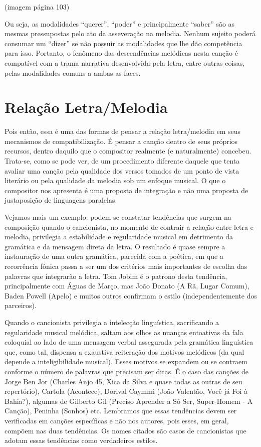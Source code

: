 (imagem página 103)

Ou seja, as modalidades ``querer'', ``poder'' e principalmente ``saber''
são as mesmas pressupostas pelo ato da asseveração na melodia. Nenhum
sujeito poderá consumar um ``dizer'' se não possuir as modalidades que
lhe dão competência para isso. Portanto, o fenômeno das descendências
melódicas nesta canção é compatível com a trama narrativa desenvolvida
pela letra, entre outras coisas, pelas modalidades comuns a ambas as
faces.

\section{Relação Letra/Melodia}

Pois então, essa é uma das formas de pensar a relação letra/melodia em
seus mecanismos de compatibilização. É pensar a canção dentro de seus
próprios recursos, dentro daquilo que o compositor realmente (e
naturalmente) concebeu. Trata-se, como se pode ver, de um procedimento
diferente daquele que tenta avaliar uma canção pela qualidade dos versos
tomados de um ponto de vista literário ou pela qualidade da melodia sob
um enfoque musical. O que o compositor nos apresenta é uma proposta de
integração e não uma proposta de justaposição de linguagens paralelas.

Vejamos mais um exemplo: podem-se constatar tendências que surgem na
composição quando o cancionista, no momento de contrair a relação entre
letra e melodia, privilegia a estabilidade e regularidade musical em
detrimento da gramática e da mensagem direta da letra. O resultado é
quase sempre a instauração de uma outra gramática, parecida com a
poética, em que a recorrência fônica passa a ser um dos critérios mais
importantes de escolha das palavras que integrarão a letra. Tom Jobim é
o patrono desta tendência, principalmente com Águas de Março, mas João
Donato (A Rã, Lugar Comum), Baden Powell (Apelo) e muitos outros
confirmam o estilo (independentemente dos parceiros).

Quando o cancionista privilegia a intelecção linguística, sacrificando a
regularidade musical melódica, saltam aos olhos as nuanças entoativas da
fala coloquial ao lado de uma mensagem verbal assegurada pela gramática
linguística que, como tal, dispensa a exaustiva reiteração dos motivos
melódicos (da qual depende a inteligibilidade musical). Esses motivos se
expandem ou se contraem conforme o número de palavras que precisam ser
ditas. É o caso das canções de Jorge Ben Jor (Charles Anjo 45, Xica da
Silva e quase todas as outras de seu repertório), Cartola (Acontece),
Dorival Caymmi (João Valentão, Você já Foi à Bahia?), algumas de
Gilberto Gil (Preciso Aprender a Só Ser, Super-Homem - A Canção),
Peninha (Sonhos) etc. Lembramos que essas tendências devem ser
verificadas em canções específicas e não nos autores, pois esses, em
geral, compõem nas duas tendências. Os nomes citados são casos de
cancionistas que adotam essas tendências como verdadeiros estilos.

